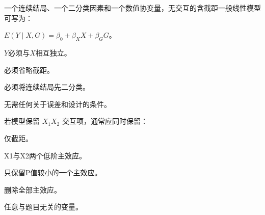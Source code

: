 \par\addvspace{6pt}\noindent\begin{minipage}{\linewidth}


一个连续结局、一个二分类因素和一个数值协变量，无交互的含截距一般线性模型可写为：


\begin{choices}

\item \(E(Y\mid X,G)=\beta_0+\beta_X X+\beta_G G\)。

\item \(Y\)必须与\(X\)相互独立。

\item 必须省略截距。

\item 必须将连续结局先二分类。

\item 无需任何关于误差和设计的条件。

\end{choices}

\end{minipage}\par\vspace{4pt}

\par\addvspace{6pt}\noindent\begin{minipage}{\linewidth}


若模型保留 \(X_1X_2\) 交互项，通常应同时保留：


\begin{choices}

\item 仅截距。

\item X1与X2两个低阶主效应。

\item 只保留P值较小的一个主效应。

\item 删除全部主效应。

\item 任意与题目无关的变量。

\end{choices}

\end{minipage}\par\vspace{4pt}

